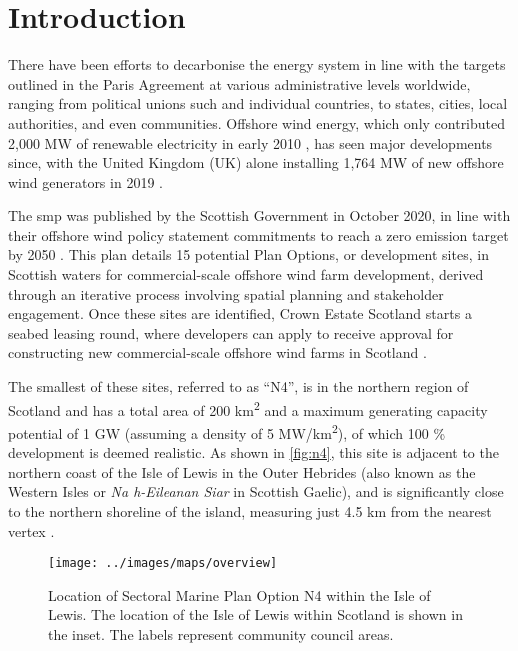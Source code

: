 \chapter{Introduction}

There have been efforts to decarbonise the energy system in line with the targets outlined in the Paris Agreement at various administrative levels worldwide, ranging from political unions such and individual countries, to states, cities, local authorities, and even communities. Offshore wind energy, which only contributed 2,000 MW of renewable electricity in early 2010 \autocite{esteban2011}, has seen major developments since, with the United Kingdom (UK) alone installing 1,764 MW of new offshore wind generators in 2019 \autocite{windeurope2020}.

The \gls{smp} was published by the Scottish Government in October 2020, in line with their offshore wind policy statement commitments to reach a zero emission target by 2050 \autocite{govscot-smp}. This plan details 15 potential Plan Options, or development sites, in Scottish waters for commercial-scale offshore wind farm development, derived through an iterative process involving spatial planning and stakeholder engagement. Once these sites are identified, Crown Estate Scotland starts a seabed leasing round, where developers can apply to receive approval for constructing new commercial-scale offshore wind farms in Scotland \autocite{crownestate}.

The smallest of these sites, referred to as ``N4'', is in the northern region of Scotland and has a total area of 200 km\textsuperscript{2} and a maximum generating capacity potential of 1 GW (assuming a density of 5 MW/km\textsuperscript{2}), of which 100 \% development is deemed realistic. As shown in \autoref{fig:n4}, this site is adjacent to the northern coast of the Isle of Lewis in the Outer Hebrides (also known as the Western Isles or \textit{Na h-Eileanan Siar} in Scottish Gaelic), and is significantly close to the northern shoreline of the island, measuring just 4.5 km from the nearest vertex \autocite{naturescot-smp}.

\begin{figure}
  \centering
  \texttt{[image: ../images/maps/overview]}
  \caption{Location of Sectoral Marine Plan Option N4 within the Isle of Lewis. The location of the Isle of Lewis within Scotland is shown in the inset. The labels represent community council areas. \label{fig:n4}}
\end{figure}

